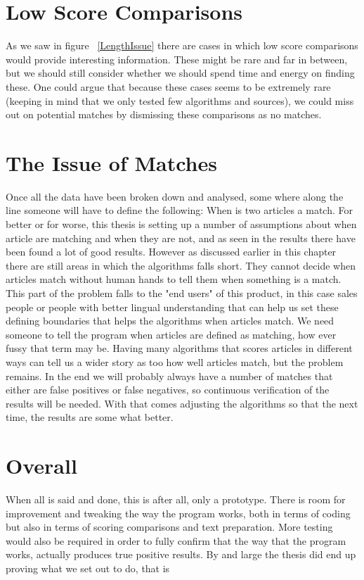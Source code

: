 \section{Low Score Comparisons}
As we saw in figure ~\ref{LengthIssue} there are cases in which low score comparisons would provide interesting information. These might be rare and far in between, but we should still consider whether we should spend time and energy on finding these. One could argue that because these cases seems to be extremely rare (keeping in mind that we only tested few algorithms and sources), we could miss out on potential matches by dismissing these comparisons as no matches.

\section{The Issue of Matches}
Once all the data have been broken down and analysed, some where along the line someone will have to define the following: When is two articles a match. For better or for worse, this thesis is setting up a number of assumptions about when article are matching and when they are not, and as seen in the results there have been found a lot of good results. However as discussed earlier in this chapter there are still areas in which the algorithms falls short. They cannot decide when articles match without human hands to tell them when something is a match. This part of the problem falls to the "end users" of this product, in this case sales people or people with better lingual understanding that can help us set these defining boundaries that helps the algorithms when articles match. We need someone to tell the program when articles are defined as matching, how ever fussy that term may be. Having many algorithms that scores articles in different ways can tell us a wider story as too how well articles match, but the problem remains. In the end we will probably always have a number of matches that either are false positives or false negatives, so continuous verification of the results will be needed. With that comes adjusting the algorithms so that the next time, the results are some what better.

\section{Overall}
When all is said and done, this is after all, only a prototype. There is room for improvement and tweaking the way the program works, both in terms of coding but also in terms of scoring comparisons and text preparation. More testing would also be required in order to fully confirm that the way that the program works, actually produces true positive results. By and large the thesis did end up proving what we set out to do, that is

